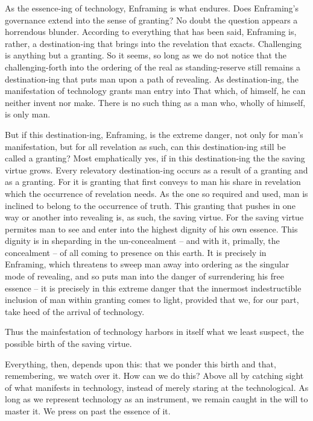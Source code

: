\documentclass[paper=a4, fontsize=11pt,twoside]{scrartcl}
\begin{document}
As the essence-ing of technology, Enframing is what endures. Does Enframing's governance extend into the sense of granting? No doubt the question appears a horrendous blunder. According to everything that has been said, Enframing is, rather, a destination-ing that brings into the revelation that exacts. Challenging is anything but a granting. So it seems, so long as we do not notice that the challenging-forth into the ordering of the real as standing-reserve still remains a destination-ing that puts man upon a path of revealing. As destination-ing, the manifestation of technology grants man entry into That which, of himself, he can neither invent nor make. There is no such thing as a man who, wholly of himself, is only man.

But if this destination-ing, Enframing, is the extreme danger, not only for man's manifestation, but for all revelation as such, can this destination-ing still be called a granting? Most emphatically yes, if in this destination-ing the the saving virtue grows. Every relevatory destination-ing occurs as a result of a granting and as a granting. For it is granting that first conveys to man his share in revelation which the occurrence of revelation needs. As the one so required and used, man is inclined to belong to the occurrence of truth. This granting that pushes in one way or another into revealing is, as such, the saving virtue. For the saving virtue permites man to see and enter into the highest dignity of his own essence. This dignity is in sheparding in the un-concealment -- and with it, primally, the concealment -- of all coming to presence on this earth. It is precisely in Enframing, which threatens to sweep man away into ordering as the singular mode of revealing, and so puts man into the danger of surrendering his free essence -- it is precisely in this extreme danger that the innermost indestructible inclusion of man within granting comes to light, provided that we, for our part, take heed of the arrival of technology.

Thus the mainfestation of technology harbors in itself what we least suspect, the possible birth of the saving virtue. 

Everything, then, depends upon this: that we ponder this birth and that, remembering, we watch over it. How can we do this? Above all by catching sight of what manifests in technology, instead of merely staring at the technological. As long as we represent technology as an instrument, we remain caught in the will to master it. We press on past the essence of it.
\end{document}
